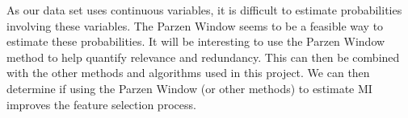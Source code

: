 \documentclass[12pt, twoside, a4paper]{report}
\begin{document}
As our data set uses continuous variables, it is difficult to estimate probabilities involving these variables. The Parzen Window \cite{RefWorks:183} seems to be a feasible way to estimate these probabilities. It will be interesting to use the Parzen Window method to help quantify relevance and redundancy. This can then be combined with the other methods and algorithms used in this project. We can then determine if using the Parzen Window (or other methods) to estimate MI improves the feature selection process.


\newpage




\end{document}
